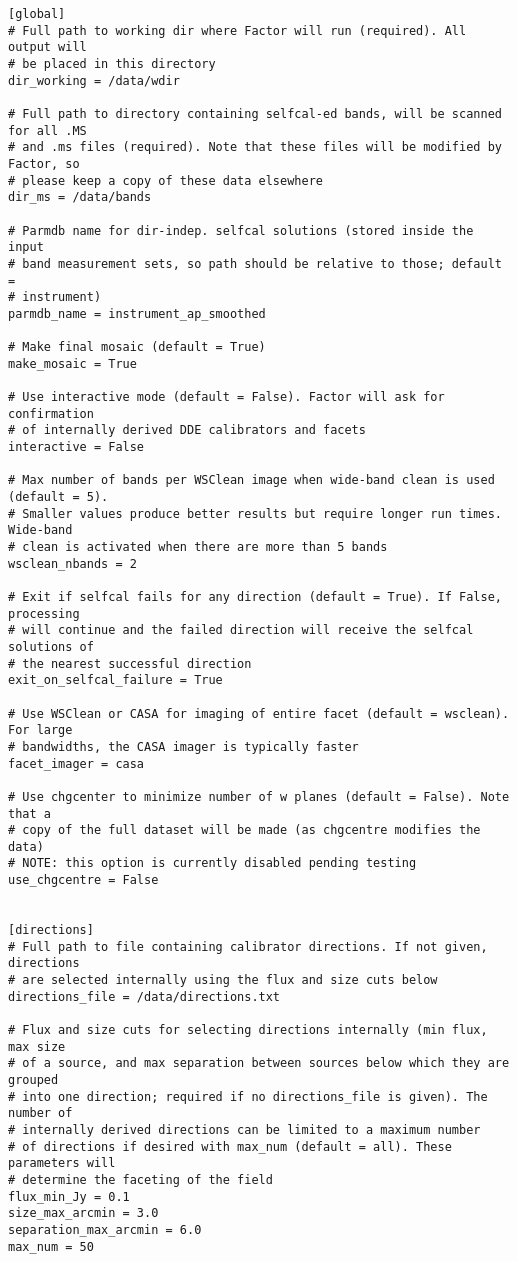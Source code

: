 \documentclass[structabstract]{article}
\begin{document}
\begin{verbatim}
[global]
# Full path to working dir where Factor will run (required). All output will
# be placed in this directory
dir_working = /data/wdir

# Full path to directory containing selfcal-ed bands, will be scanned for all .MS
# and .ms files (required). Note that these files will be modified by Factor, so
# please keep a copy of these data elsewhere
dir_ms = /data/bands

# Parmdb name for dir-indep. selfcal solutions (stored inside the input
# band measurement sets, so path should be relative to those; default =
# instrument)
parmdb_name = instrument_ap_smoothed

# Make final mosaic (default = True)
make_mosaic = True

# Use interactive mode (default = False). Factor will ask for confirmation
# of internally derived DDE calibrators and facets
interactive = False

# Max number of bands per WSClean image when wide-band clean is used (default = 5).
# Smaller values produce better results but require longer run times. Wide-band
# clean is activated when there are more than 5 bands
wsclean_nbands = 2

# Exit if selfcal fails for any direction (default = True). If False, processing
# will continue and the failed direction will receive the selfcal solutions of
# the nearest successful direction
exit_on_selfcal_failure = True

# Use WSClean or CASA for imaging of entire facet (default = wsclean). For large
# bandwidths, the CASA imager is typically faster
facet_imager = casa

# Use chgcenter to minimize number of w planes (default = False). Note that a
# copy of the full dataset will be made (as chgcentre modifies the data)
# NOTE: this option is currently disabled pending testing
use_chgcentre = False


[directions]
# Full path to file containing calibrator directions. If not given, directions
# are selected internally using the flux and size cuts below
directions_file = /data/directions.txt

# Flux and size cuts for selecting directions internally (min flux, max size
# of a source, and max separation between sources below which they are grouped
# into one direction; required if no directions_file is given). The number of
# internally derived directions can be limited to a maximum number
# of directions if desired with max_num (default = all). These parameters will
# determine the faceting of the field
flux_min_Jy = 0.1
size_max_arcmin = 3.0
separation_max_arcmin = 6.0
max_num = 50


\end{verbatim}
\end{document}
